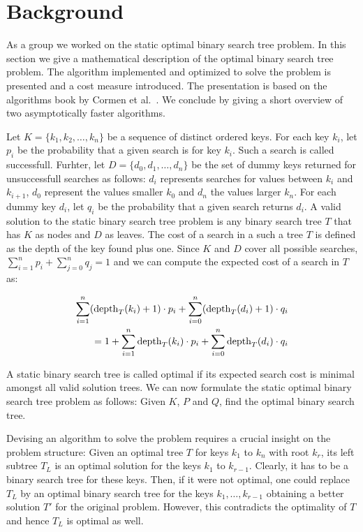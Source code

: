 \section{Background}

As a group we worked on the static optimal binary search tree problem.
In this section we give a mathematical description of the optimal binary
search tree problem. The algorithm implemented and optimized to solve the
problem is presented and a cost measure introduced. The presentation is
based on the algorithms book by Cormen et al.~\cite{MITBook}. We conclude
by giving a short overview of two asymptotically faster algorithms.

 Let $K = \{k_1, k_2, \dots, k_n\}$ be a sequence
of distinct ordered keys. For each key $k_i$, let $p_i$ be the probability
that a given search is for key $k_i$. Such a search is called successfull.
Furhter, let $D = \{d_0, d_1, \dots, d_n\}$ be the set of dummy keys
returned for unsuccessfull searches as follows: $d_i$ represents searches
for values between $k_i$ and $k_{i+1}$, $d_0$ represent the values smaller
$k_0$ and $d_n$ the values larger $k_n$. For each dummy key $d_i$, let
$q_i$ be the probability that a given search returns $d_i$.
A valid solution to the static binary search tree problem is any binary
search tree $T$ that has $K$ as nodes and $D$ as leaves.
The cost of a search in a such a tree $T$ is defined as the depth of the key
found plus one. Since $K$ and $D$ cover all possible searches,
$\sum_{i=1}^n p_i + \sum_{j=0}^n q_j = 1$ and we can compute the expected
cost of a search in $T$ as:

\begin{align}
  \sum_{i=1}^n (\operatorname{depth}_T(k_i) + 1) \cdot p_i
   + \sum_{i=0}^n (\operatorname{depth}_T(d_i) + 1) \cdot q_i
  \nonumber\\
  = 1 + \sum_{i=1}^n \operatorname{depth}_T(k_i) \cdot p_i
      + \sum_{i=0}^n \operatorname{depth}_T(d_i) \cdot q_i
  \label{eqn:cost}
\end{align}

A static binary search tree is called optimal if its expected search cost
is minimal amongst all valid solution trees.
We can now formulate the static optimal binary search tree problem as
follows: Given $K$, $P$ and $Q$, find the optimal binary search tree.

 Devising an algorithm to solve the problem requires a
crucial insight on the problem structure: Given an optimal tree $T$ for
keys $k_1$ to $k_n$ with root $k_r$, its left subtree $T_L$ is an optimal
solution for the keys $k_1$ to $k_{r-1}$. Clearly, it has to be a binary
search tree for these keys. Then, if it were not optimal, one could replace
$T_L$ by an optimal binary search tree for the keys $k_1,\dots,k_{r-1}$
obtaining a better solution $T'$ for the original problem. However, this
contradicts the optimality of $T$ and hence $T_L$ is optimal as well.

